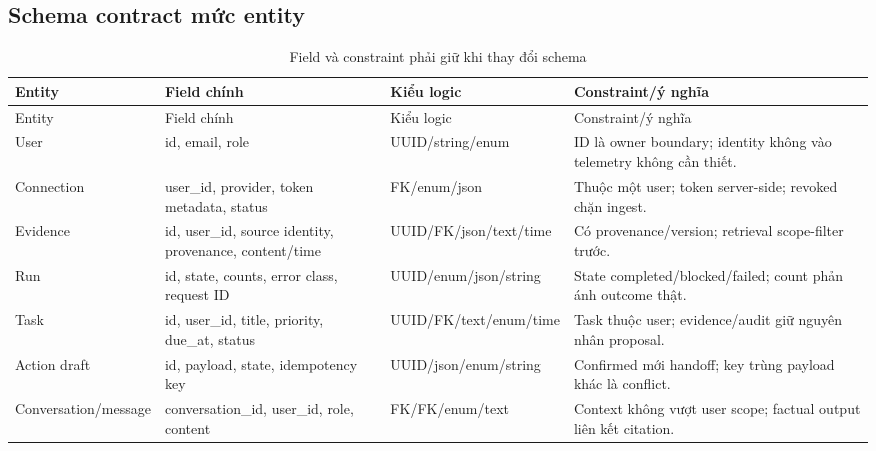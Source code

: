 \documentclass[12pt,a4paper]{article}
\begin{document}
\subsection{Schema contract mức entity}
\begin{longtable}{p{3.0cm}p{3.5cm}p{3.0cm}p{4.7cm}}
\caption{Field và constraint phải giữ khi thay đổi schema}\label{tab:sdd-schema-contract}\\
\toprule Entity & Field chính & Kiểu logic & Constraint/ý nghĩa \\ \midrule
\endfirsthead
\toprule Entity & Field chính & Kiểu logic & Constraint/ý nghĩa \\ \midrule
\endhead
User & id, email, role & UUID/string/enum & ID là owner boundary; identity không vào telemetry không cần thiết. \\
Connection & user\_id, provider, token metadata, status & FK/enum/json & Thuộc một user; token server-side; revoked chặn ingest. \\
Evidence & id, user\_id, source identity, provenance, content/time & UUID/FK/json/text/time & Có provenance/version; retrieval scope-filter trước. \\
Run & id, state, counts, error class, request ID & UUID/enum/json/string & State completed/blocked/failed; count phản ánh outcome thật. \\
Task & id, user\_id, title, priority, due\_at, status & UUID/FK/text/enum/time & Task thuộc user; evidence/audit giữ nguyên nhân proposal. \\
Action draft & id, payload, state, idempotency key & UUID/json/enum/string & Confirmed mới handoff; key trùng payload khác là conflict. \\
Conversation/message & conversation\_id, user\_id, role, content & FK/FK/enum/text & Context không vượt user scope; factual output liên kết citation. \\
\bottomrule
\end{longtable}
\end{document}
